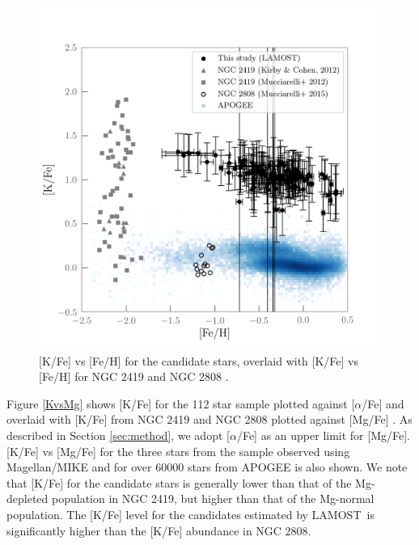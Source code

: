 \documentclass[a4paper,fleqn,usenatbib]{mnras}
\newcommand{\project}[1]{#1}
\newcommand{\lamost}{\project{LAMOST}}
\begin{document}
\begin{figure}
	\includegraphics[width=\columnwidth]{KvsFe.png}
    \caption{[K/Fe] vs [Fe/H] for the candidate stars, overlaid with [K/Fe] vs [Fe/H] for NGC 2419 and NGC 2808 \citep{cohenkirby2012, mucciarelli2012, mucciarelli2015}.}
    \label{KvsFe}
\end{figure}

Figure \ref{KvsMg} shows [K/Fe]  for the 112 star sample plotted against $[\alpha$/Fe] and overlaid with [K/Fe] from NGC 2419 and NGC 2808 plotted against [Mg/Fe] \citep{cohenkirby2012, mucciarelli2012, mucciarelli2015}. As described in Section \ref{sec:method}, we adopt [$\alpha$/Fe] as an upper limit for [Mg/Fe]. [K/Fe] vs [Mg/Fe] for the three stars from the sample observed using Magellan/MIKE and for over 60000 stars from APOGEE \citep{alam2015} is also shown. 
We note that [K/Fe] for the candidate stars is generally lower than that of the Mg-depleted population in NGC 2419, but higher than that of the Mg-normal population. The [K/Fe] level for the candidates estimated by \lamost\ is significantly higher than the [K/Fe] abundance in NGC 2808.
\end{document}

